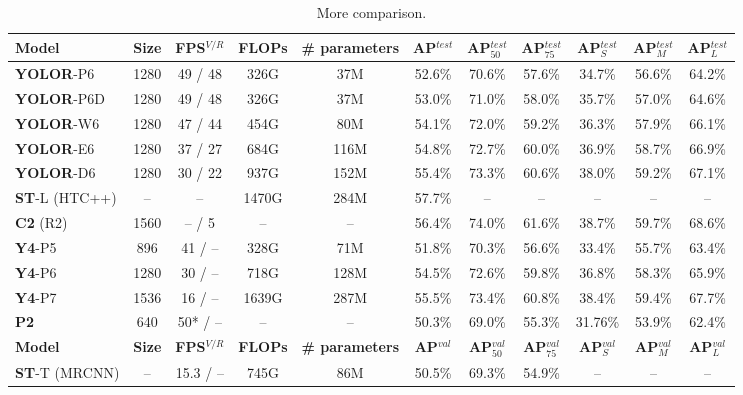 \documentclass[10pt,twocolumn,letterpaper]{article}
\begin{document}
\begin{table*}[t]
\centering
\begin{threeparttable}[t]
	\footnotesize
	\caption{More comparison.}
	\label{table:more}
	\setlength\tabcolsep{5.8pt}
	\begin{tabular}{lcccccccccc}
		\toprule
		\textbf{Model} & \textbf{Size} & \textbf{FPS$^{V/R}$} & \textbf{FLOPs} & \textbf{\# parameters} & \textbf{AP$^{test}$} & \textbf{AP$^{test}_{50}$} & \textbf{AP$^{test}_{75}$} & \textbf{AP$^{test}_{S}$} & \textbf{AP$^{test}_{M}$} & \textbf{AP$^{test}_{L}$} \\				
		\midrule
		\textbf{YOLOR}-P6 & 1280 & 49 / 48  & 326G & 37M & 52.6\% & 70.6\% & 57.6\% & 34.7\% & 56.6\% & 64.2\% \\
		\textbf{YOLOR}-P6D & 1280 & 49 / 48  & 326G & 37M & 53.0\% & 71.0\% & 58.0\% & 35.7\% & 57.0\% & 64.6\% \\
		\textbf{YOLOR}-W6 & 1280 & 47 / 44 & 454G & 80M & 54.1\% & 72.0\% & 59.2\% & 36.3\% & 57.9\% & 66.1\% \\
		\textbf{YOLOR}-E6 & 1280 & 37 / 27 & 684G & 116M & 54.8\% & 72.7\% & 60.0\% & 36.9\% & 58.7\% & 66.9\% \\		
		\textbf{YOLOR}-D6 & 1280 & 30 / 22 & 937G & 152M & 55.4\% & 73.3\% & 60.6\% & 38.0\% & 59.2\% & 67.1\% \\		
		\midrule
		\textbf{ST}-L (HTC++) & -- & -- & 1470G & 284M & 57.7\% & -- & -- & -- & -- & -- \\
		\midrule
		\textbf{C2} (R2) & 1560 & -- / 5 & -- & -- & 56.4\% & 74.0\% & 61.6\% & 38.7\% & 59.7\% & 68.6\% \\
		\midrule
		\textbf{Y4}-P5 & 896 & 41 / -- & 328G & 71M & 51.8\% & 70.3\% & 56.6\% & 33.4\% & 55.7\% & 63.4\% \\
		\textbf{Y4}-P6 & 1280 & 30 / -- & 718G & 128M & 54.5\% & 72.6\% & 59.8\% & 36.8\% & 58.3\% & 65.9\% \\
		\textbf{Y4}-P7 & 1536 & 16 / -- & 1639G & 287M & 55.5\% & 73.4\% & 60.8\% & 38.4\% & 59.4\% & 67.7\% \\
		\midrule
		\textbf{P2} & 640 & 50* / -- & -- & -- & 50.3\% & 69.0\% & 55.3\% & 31.76\% & 53.9\% & 62.4\% \\
		\midrule
		\midrule
		\textbf{Model} & \textbf{Size} & \textbf{FPS$^{V/R}$} & \textbf{FLOPs} & \textbf{\# parameters} & \textbf{AP$^{val}$} & \textbf{AP$^{val}_{50}$} & \textbf{AP$^{val}_{75}$} & \textbf{AP$^{val}_{S}$} & \textbf{AP$^{val}_{M}$} & \textbf{AP$^{val}_{L}$} \\		
		\midrule
		\textbf{ST}-T (MRCNN) & -- & 15.3 / -- & 745G & 86M & 50.5\% & 69.3\% & 54.9\% & -- & -- & -- \\

\end{tabular}
\end{threeparttable}
\end{table*}
\end{document}
